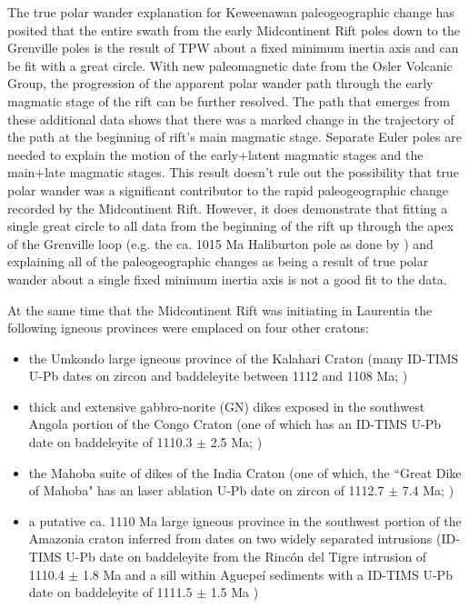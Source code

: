 \documentclass[draft,gc]{AGUTeX}
\begin{document}
\begin{article}
The true polar wander explanation for Keweenawan paleogeographic change has posited that the entire swath from the early Midcontinent Rift poles down to the Grenville poles is the result of TPW about a fixed minimum inertia axis and can be fit with a great circle. With new paleomagnetic date from the Osler Volcanic Group, the progression of the apparent polar wander path through the early magmatic stage of the rift can be further resolved. The path that emerges from these additional data shows that there was a marked change in the trajectory of the path at the beginning of rift's main magmatic stage. Separate Euler poles are needed to explain the motion of the early+latent magmatic stages and the main+late magmatic stages. This result doesn't rule out the possibility that true polar wander was a significant contributor to the rapid paleogeographic change recorded by the Midcontinent Rift. However, it does demonstrate that fitting a single great circle to all data from the beginning of the rift up through the apex of the Grenville loop (e.g. the ca. 1015 Ma Haliburton pole as done by \cite{Mitchell2012a}) and explaining all of the paleogeographic changes as being a result of true polar wander about a single fixed minimum inertia axis is not a good fit to the data.

At the same time that the Midcontinent Rift was initiating in Laurentia the following igneous provinces were emplaced on four other cratons:
\begin{itemize}
\item the Umkondo large igneous province of the Kalahari Craton (many ID-TIMS U-Pb dates on zircon and baddeleyite between 1112 and 1108 Ma; \cite{Hanson2004a})
\item  thick and extensive gabbro-norite (GN) dikes exposed in the southwest Angola portion of the Congo Craton (one of which has an ID-TIMS U-Pb date on baddeleyite of 1110.3 $\pm$ 2.5 Ma; \cite{Ernst2013a})
\item the Mahoba suite of dikes of the India Craton (one of which, the ``Great Dike of Mahoba" has an laser ablation U-Pb date on zircon of 1112.7 $\pm$ 7.4 Ma; \cite{Pradhan2012a})
\item a putative ca. 1110 Ma large igneous province in the southwest portion of the Amazonia craton inferred from dates on two widely separated intrusions (ID-TIMS U-Pb date on baddeleyite from the Rinc\'on del Tigre intrusion of 1110.4 $\pm$ 1.8 Ma and a sill within Aguepe\'i sediments with a ID-TIMS U-Pb date on baddeleyite of 1111.5 $\pm$ 1.5 Ma \cite{Hamilton2012a})
\end{itemize}


\end{article}
\end{document}
